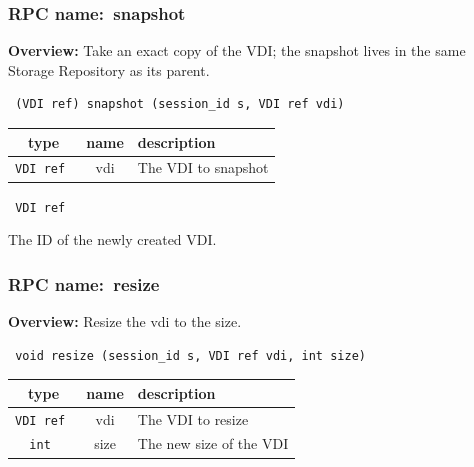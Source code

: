 \subsubsection{RPC name:~snapshot}

{\bf Overview:} 
Take an exact copy of the VDI; the snapshot lives in the same Storage Repository as its parent.

\begin{verbatim} (VDI ref) snapshot (session_id s, VDI ref vdi)\end{verbatim}



 
\vspace{0.3cm}
\begin{tabular}{|c|c|p{7cm}|}
 \hline
{\bf type} & {\bf name} & {\bf description} \\ \hline
{\tt VDI ref } & vdi & The VDI to snapshot \\ \hline 

\end{tabular}

\vspace{0.3cm}

{\tt 
VDI ref
}


The ID of the newly created VDI.
\vspace{0.3cm}
\vspace{0.3cm}
\vspace{0.3cm}
\subsubsection{RPC name:~resize}

{\bf Overview:} 
Resize the vdi to the size.

\begin{verbatim} void resize (session_id s, VDI ref vdi, int size)\end{verbatim}



 
\vspace{0.3cm}
\begin{tabular}{|c|c|p{7cm}|}
 \hline
{\bf type} & {\bf name} & {\bf description} \\ \hline
{\tt VDI ref } & vdi & The VDI to resize \\ \hline 

{\tt int } & size & The new size of the VDI \\ \hline 

\end{tabular}

